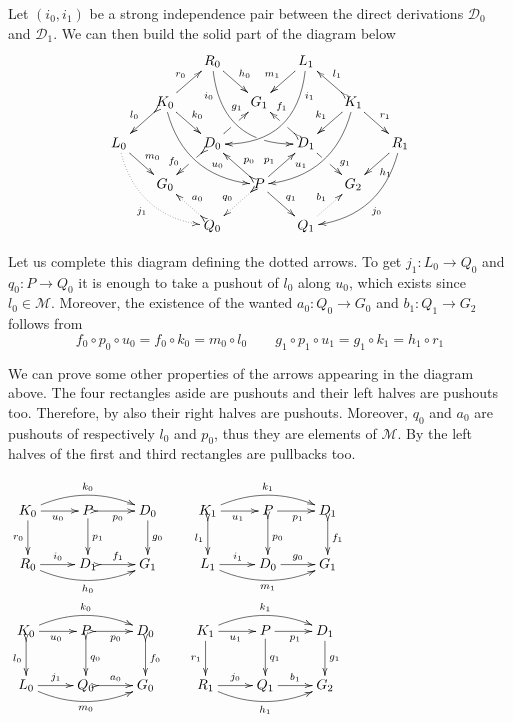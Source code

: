 \documentclass[a4paper,UKenglish,cleveref,pdftex,thm-restate,numberwithinsect]{lipics-v2021}
\newcommand{\dder}[1]{\mathscr{#1}}
\begin{document}
\begin{remark}\label{rem:deco} 
	Let $(i_0, i_1)$ be a strong
	independence pair between the direct derivations $\dder{D}_0$ and
	$\dder{D}_1$. We can then build the solid part of the diagram
	below
	\[\xymatrix@C=15pt@R=15pt{&&R_0 \ar@/_.8cm/[ddrr]_(.2){i_0}|(.7)\hole
		\ar[dr]^{h_0}&& L_1\ar@/^.8cm/[ddll]^(.2){i_1}
		\ar[dl]_{m_1}\\&K_0\ar[dr]^{k_0}\ar@{>->}[dl]_{l_0}
		\ar@/_.6cm/[ddrr]^(.65){u_0}\ar[ur]^{r_0}&& G_1 && K_1
		\ar@/^.6cm/[ddll]_(.65){u_1}\ar[dl]_{k_1}\ar@{>->}[lu]_{l_1}
		\ar[dr]^{r_1}\\L_0 \ar[dr]^{m_0}
		\ar@{.>}@/_.6cm/[ddrr]_{j_1}&& D_0
		\ar@{>->}[dl]|(.42)\hole_(.64){f_0}\ar[ur]|(.48)\hole^(.7){g_1}&&D_1
		\ar[dr]|(.42)\hole^(.65){g_1}
		\ar@{>->}[ul]|(.48)\hole_(.7){f_1}&&R_1\ar@/^.6cm/[ddll]^{j_0}\ar[dl]^{h_1}\\&G_0
		&&P\ar[dr]^{q_1}
		\ar@{>.>}[dl]_{q_0}\ar[ur]^(.4){p_1}\ar@{>->}[ul]_(.4){p_0}&&G_2\\&&Q_0
		\ar@{>->}@{>.>}[ul]_{a_0} &&Q_1\ar@{.>}[ur]^{b_1}}
	\]
	
	Let us complete this diagram defining the dotted arrows. To get
	$j_1\colon L_0\to Q_0$ and $q_0\colon P\to Q_0$ it is enough to
	take a pushout of $l_0$ along $u_0$, which exists since
	$l_0\in \mathcal{M}$. Moreover, the existence of the wanted
	$a_0\colon Q_0\to G_0$ and $b_1\colon Q_1\to G_2$ follows from
	\[
	f_0\circ p_0 \circ u_0 = f_0\circ k_0 = m_0\circ l_0 \qquad
	g_1\circ p_1\circ u_1 = g_1\circ k_1=h_1\circ r_1
	\]
	
	\noindent
	\parbox{5.5cm}{\hspace{15pt}We can prove some other properties of
		the arrows appearing in the diagram above. The four rectangles
		aside are pushouts and their left halves are pushouts
		too. Therefore, by  also their right halves are
		pushouts.  Moreover, $q_0$ and $a_0$ are pushouts of
		respectively $l_0$ and $p_0$, thus they are elements of
		$\mathcal{M}$. By  the left halves of the
		first and third rectangles are pullbacks too.}  \parbox{3.5cm}{
		$\xymatrix{K_0 \ar@/^.4cm/[rr]^{k_0}\ar[d]_{r_0}\ar[r]_{u_0}
			&P\ar[d]^{p_1} \ar@{>->}[r]_{p_0} & D_0 \ar[d]^{g_0}&K_1
			\ar@/^.4cm/[rr]^{k_1}\ar@{>->}[d]_{l_1}\ar[r]_{u_1}
			&P\ar@{>->}[d]^{p_0} \ar[r]_{p_1} & D_1 \ar@{>->}[d]^{f_1}\\
			R_0 \ar@/_.4cm/[rr]_{h_0} \ar[r]^{i_0}&D_1 \ar@{>->}[r]^{f_1}
			& G_1&L_1 \ar@/_.4cm/[rr]_{m_1} \ar[r]^{i_1}&D_0\ar[r]^{g_0} &
			G_1}$
		$\xymatrix{K_0
			\ar@/^.4cm/[rr]^{k_0}\ar@{>->}[d]_{l_0}\ar[r]_{u_0}
			&P\ar@{>->}[d]^{q_0} \ar@{>->}[r]_{p_0} & D_0
			\ar@{>->}[d]^{f_0}&K_1
			\ar@/^.4cm/[rr]^{k_1}\ar[d]_{r_1}\ar[r]_{u_1}
			&P\ar[d]^{q_1} \ar[r]_{p_1} & D_1 \ar[d]^{g_1}\\
			L_0 \ar@/_.4cm/[rr]_{m_0} \ar[r]^{j_1}&Q_0 \ar@{>->}[r]^{a_0}
			& G_0&R_1 \ar@/_.4cm/[rr]_{h_1} \ar[r]^{j_0}&Q_1 \ar[r]^{b_1}
			& G_2}$}
\end{remark}
\end{document}
